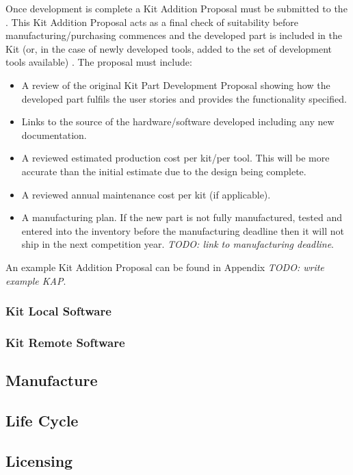 \begin{draft}
Once development is complete a Kit Addition Proposal must be submitted to the . This Kit Addition Proposal acts as a final check of suitability before manufacturing/purchasing commences and the developed part is included in the Kit (or, in the case of newly developed tools, added to the set of development tools available) . The proposal must include:
\begin{itemize}
  \item A review of the original Kit Part Development Proposal showing how the developed part fulfils the user stories and provides the functionality specified.
  \item Links to the source of the hardware/software developed including any new documentation.
  \item A reviewed estimated production cost per kit/per tool. This will be more accurate than the initial estimate due to the design being complete.
  \item A reviewed annual maintenance cost per kit (if applicable).
  \item A manufacturing plan. If the new part is not fully manufactured, tested and entered into the inventory before the manufacturing deadline then it will not ship in the next competition year. \emph{TODO: link to manufacturing deadline}.
\end{itemize}

An example Kit Addition Proposal can be found in Appendix \emph{TODO: write example KAP}.

\subsubsection{Kit Local Software}
\subsubsection{Kit Remote Software}

\subsection{Manufacture}

\subsection{Life Cycle}

\subsection{Licensing}


\end{draft}
